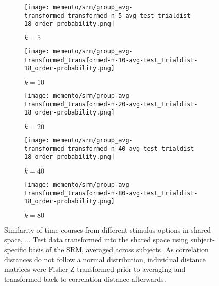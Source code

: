 \begin{figure}
	\centering
	\begin{subfigure}{.18\textwidth}
		\texttt{[image: memento/srm/group\_avg-transformed\_transformed-n-5-avg-test\_trialdist-18\_order-probability.png]}
		\caption{$k=5$}
		\label{fig:shared5}
	\end{subfigure}
	\begin{subfigure}{0.18\textwidth}
		\texttt{[image: memento/srm/group\_avg-transformed\_transformed-n-10-avg-test\_trialdist-18\_order-probability.png]}
		\caption{$k=10$}
		\label{fig:shared10}
	\end{subfigure}
	\begin{subfigure}{.18\textwidth}
		\texttt{[image: memento/srm/group\_avg-transformed\_transformed-n-20-avg-test\_trialdist-18\_order-probability.png]}
		\caption{$k=20$}
		\label{fig:shared20}
	\end{subfigure}
	\begin{subfigure}{0.18\textwidth}
		\texttt{[image: memento/srm/group\_avg-transformed\_transformed-n-40-avg-test\_trialdist-18\_order-probability.png]}
		\caption{$k=40$}
		\label{fig:shared40}
	\end{subfigure}
	\begin{subfigure}{0.18\textwidth}
		\texttt{[image: memento/srm/group\_avg-transformed\_transformed-n-80-avg-test\_trialdist-18\_order-probability.png]}
		\caption{$k=80$}
		\label{fig:shared80}
	\end{subfigure}
	\caption[Transformed test data in shared space]{Similarity of time courses from different stimulus options in shared space, ... Test data transformed into the shared space using subject-specific basis of the \gls{SRM}, averaged across subjects. As correlation distances do not follow a normal distribution, individual distance matrices were Fisher-Z-transformed prior to averaging and transformed back to correlation distance afterwards.}
	\label{fig:srmtransformedspaces}
\end{figure}

